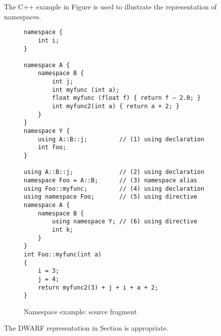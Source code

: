 The C++ example in 
Figure 
is used to illustrate the representation of namespaces.

\begin{figure}[here]
\begin{lstlisting}
namespace {
    int i;
}

namespace A {
    namespace B {
        int j;
        int myfunc (int a);
        float myfunc (float f) { return f – 2.0; }
        int myfunc2(int a) { return a + 2; }
    }
}
namespace Y {
    using A::B::j;         // (1) using declaration
    int foo;
}

using A::B::j;             // (2) using declaration
namespace Foo = A::B;      // (3) namespace alias
using Foo::myfunc;         // (4) using declaration
using namespace Foo;       // (5) using directive
namespace A {
    namespace B {
        using namespace Y; // (6) using directive
        int k;
    }
}
int Foo::myfunc(int a)
{
    i = 3;
    j = 4;
    return myfunc2(3) + j + i + a + 2;
}
\end{lstlisting}
\caption{Namespace example: source fragment} \label{fig:namespaceexamplesourcefragment}
\end{figure}


The DWARF representation in 
Section 
is appropriate.

